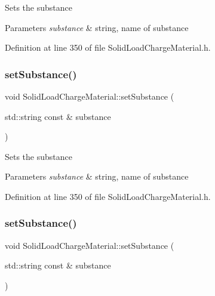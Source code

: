 Sets the substance 
\begin{DoxyParams}{Parameters}
{\em substance} & string, name of substance \\
\hline
\end{DoxyParams}


Definition at line 350 of file Solid\+Load\+Charge\+Material.\+h.

\mbox{\label{class_solid_load_charge_material_aebe376ab016f48678c3a70390b4ea52a}} 
\subsubsection{\texorpdfstring{set\+Substance()}{setSubstance()}\hspace{0.1cm}{\footnotesize\ttfamily [2/3]}}
{\footnotesize\ttfamily void Solid\+Load\+Charge\+Material\+::set\+Substance (\begin{DoxyParamCaption}\item[{std\+::string const \&}]{substance }\end{DoxyParamCaption})\hspace{0.3cm}{\ttfamily [inline]}}

Sets the substance 
\begin{DoxyParams}{Parameters}
{\em substance} & string, name of substance \\
\hline
\end{DoxyParams}


Definition at line 350 of file Solid\+Load\+Charge\+Material.\+h.

\mbox{\label{class_solid_load_charge_material_aebe376ab016f48678c3a70390b4ea52a}} 
\subsubsection{\texorpdfstring{set\+Substance()}{setSubstance()}\hspace{0.1cm}{\footnotesize\ttfamily [3/3]}}
{\footnotesize\ttfamily void Solid\+Load\+Charge\+Material\+::set\+Substance (\begin{DoxyParamCaption}\item[{std\+::string const \&}]{substance }\end{DoxyParamCaption})\hspace{0.3cm}{\ttfamily [inline]}}

